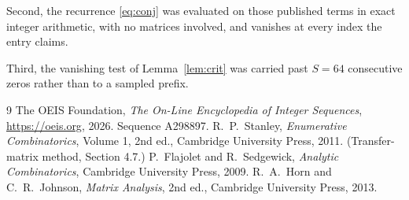 \documentclass[11pt,a4paper]{article}
\theoremstyle{plain}
\theoremstyle{definition}
\begin{document}
Second, the recurrence \eqref{eq:conj} was evaluated on those published terms in exact
integer arithmetic, with no matrices involved, and vanishes at every index the entry claims.

Third, the vanishing test of Lemma~\ref{lem:crit} was carried past $S=64$ consecutive
zeros rather than to a sampled prefix.

\begin{thebibliography}{9}
 The OEIS Foundation, \emph{The On-Line Encyclopedia of Integer
Sequences}, \url{https://oeis.org}, 2026. Sequence A298897.
 R.~P.~Stanley, \emph{Enumerative Combinatorics}, Volume 1, 2nd ed.,
Cambridge University Press, 2011. (Transfer-matrix method, Section 4.7.)
 P.~Flajolet and R.~Sedgewick, \emph{Analytic Combinatorics}, Cambridge
University Press, 2009.
 R.~A.~Horn and C.~R.~Johnson, \emph{Matrix Analysis}, 2nd ed., Cambridge
University Press, 2013.
\end{thebibliography}
\end{document}
